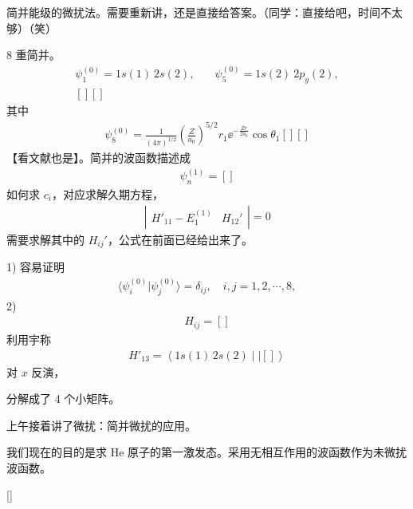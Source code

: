 简并能级的微扰法。需要重新讲，还是直接给答案。（同学：直接给吧，时间不太够）（笑）

8 重简并。
\begin{align}
    \psi_1^{(0)} = 1s(1) \ 2s(2), \quad & \psi_5^{(0)} = 1s(2) \ 2p_y(2), \\
    [][]
\end{align}
其中
\begin{align}
    \psi_8^{(0)} = \frac1{(4\pi)^{1/2}} \left(\frac Z{a_0}\right)^{5/2} r_1 \ee^{-\frac{Z r}{2a_0}} \cos\theta_1 [][]
\end{align}
【看文献也是】。简并的波函数描述成
\begin{align}
    \psi_n^{(1)} = []
\end{align}
如何求 $c_i$，对应求解久期方程，
\begin{align}
    \left|\begin{matrix}
        H'_{11} - E_1^{(1)} & H_{12}'
    \end{matrix}\right| = 0
\end{align}
需要求解其中的 $H_{ij}'$，公式在前面已经给出来了。

1) 容易证明
\begin{align}
    \langle \psi_i^{(0)} | \psi_j^{(0)} \rangle = \delta_{ij}, \quad i,j = 1, 2, \cdots, 8,
\end{align}
2) 
\begin{align}
    H_{ij} = []
\end{align}
利用宇称
\begin{align}
    H'_{13} = \left\langle 1s(1) \, 2s(2) \mid | [] 
    \right\rangle
\end{align}
对 $x$ 反演，

分解成了 4 个小矩阵。


上午接着讲了微扰：简并微扰的应用。

我们现在的目的是求 He 原子的第一激发态。采用无相互作用的波函数作为未微扰波函数。

[]

